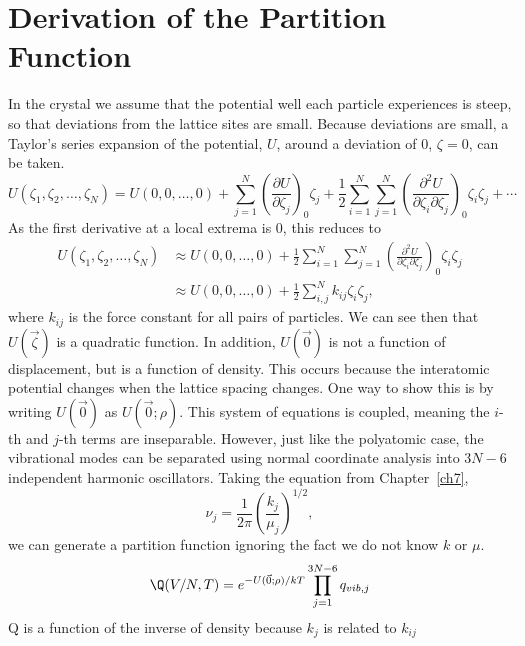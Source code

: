 \section{Derivation of the Partition Function}%
\label{sec:crystal_dpf}
In the crystal we assume that the potential well each particle experiences is
steep, so that deviations from the lattice sites are small. Because deviations
are small, a Taylor's series expansion of the potential, $U$, around a deviation
of 0, $\zeta = 0$, can be taken.
\begin{equation*}
	U(\zeta_1 , \zeta_2 , \ldots, \zeta_{N}) = U(0, 0, \ldots, 0) +
	\sum_{j=1}^{N}{{\left(\frac{\partial U}{\partial \zeta_j }\right)}_0 \zeta_j}
	+ \frac{1}{2} \sum_{i=1}^{N} \sum_{j=1}^{N}{{\left(\frac{\partial^2
	U}{\partial \zeta_i \partial \zeta_j }\right)}_0 \zeta_i \zeta_j } + \cdots
\end{equation*}
As the first derivative at a local extrema is 0, this reduces to
\begin{align*}
	U(\zeta_1 , \zeta_2 , \ldots, \zeta_{N}) &\approx U(0, 0, \ldots, 0) +
	\frac{1}{2} \sum_{i=1}^{N} \sum_{j=1}^{N}{{\left(\frac{\partial^2
	U}{\partial \zeta_i \partial \zeta_j }\right)}_0 \zeta_i \zeta_j }\\
	&\approx U(0, 0, \ldots, 0) + \frac{1}{2} \sum_{i,j}^{N}{k_{ij} \zeta_i
	\zeta_{j}},
\end{align*}
where $k_{ij}$ is the force constant for all pairs of particles. We can see then
that $U(\vec{\zeta})$ is a quadratic function. In addition, $U(\vec{0})$
is not a function of displacement, but is a function of density. This occurs
because the interatomic potential changes when the lattice spacing changes. One
way to show this is by writing $U(\vec{0})$ as $U(\vec{0}; \rho)$. This system
of equations is coupled, meaning the  $i$-th and $j$-th terms are inseparable.
However, just like the polyatomic case, the vibrational modes can be separated
using normal coordinate analysis into $3N - 6$ independent harmonic oscillators.
Taking the equation from Chapter~\ref{ch7}, 
\begin{equation*}
	\nu_j = \frac{1}{2\pi} {\left( \frac{k_j }{\mu_j }\right)}^{1/2}, 
\end{equation*}
we can generate a partition function ignoring the fact we do not know $k$ or
$\mu$.
\begin{equation*}
	\Q(V/N, T) = e^{-U(\vec{0}; \rho)/kT} \prod_{j=1}^{3N - 6}{q_{vib, j}}
\end{equation*}
Q is a function of the inverse of density because $k_{j}$ is related to $k_{ij}$
